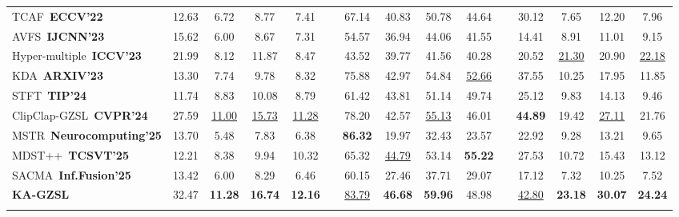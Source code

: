 \documentclass[lettersize,journal]{IEEEtran}
\begin{document}
\begin{table}[!t]
\begin{tabular}{l cccc c cccc c cccc}
    TCAF \cite{5} \,{\scriptsize \textbf{ECCV'22}} & 12.63 & 6.72 & 8.77 & 7.41 & & 67.14 & 40.83 & 50.78 & 44.64 & & 30.12 & 7.65 & 12.20 & 7.96 \\
    AVFS \cite{6} \,{\scriptsize \textbf{IJCNN'23}} & 15.62 & 6.00 & 8.67 & 7.31 & & 54.57 & 36.94 & 44.06 & 41.55 & & 14.41 & 8.91 & 11.01 & 9.15 \\
    Hyper-multiple \cite{7} \,{\scriptsize \textbf{ICCV'23}} & 21.99 & 8.12 & 11.87 & 8.47 & & 43.52 & 39.77 & 41.56 & 40.28 & & 20.52 & \underline{21.30} & 20.90 & \underline{22.18} \\
    KDA \cite{9} \,{\scriptsize \textbf{ARXIV'23}} & 13.30 & 7.74 & 9.78 & 8.32 & & 75.88 & 42.97 & 54.84 & \underline{52.66} & & 37.55 & 10.25 & 17.95 & 11.85 \\
    STFT\cite{43} \,{\scriptsize \textbf{TIP'24}} & 11.74 & 8.83 & 10.08 & 8.79 & & 61.42 & 43.81 & 51.14 & 49.74 & & 25.12 & 9.83 & 14.13 & 9.46 \\
    ClipClap-GZSL \cite{2} \,{\scriptsize \textbf{CVPR'24}} & 27.59 & \underline{11.00} & \underline{15.73} & \underline{11.28} & & 78.20 & 42.57 & \underline{55.13} & 46.01 & & \textbf{44.89} & 19.42 & \underline{27.11} & 21.76 \\
    MSTR \cite{14} \,{\scriptsize \textbf{Neurocomputing'25}} & 13.70 & 5.48 & 7.83 & 6.38 & & \textbf{86.32} & 19.97 & 32.43 & 23.57 & & 22.92 & 9.28 & 13.21 & 9.65 \\
    MDST++ \cite{44} \,{\scriptsize \textbf{TCSVT'25}} & 12.21 & 8.38 & 9.94 & 10.32 & & 65.32 & \underline{44.79} & 53.14 & \textbf{55.22} & & 27.53 & 10.72 & 15.43 & 13.12 \\
    SACMA \cite{45} \,{\scriptsize \textbf{Inf.Fusion'25}} & 13.42 & 6.00 & 8.29 & 6.46 & & 60.15 & 27.46 & 37.71 & 29.07 & & 17.12 & 7.32 & 10.25 & 7.52 \\
    
    \noalign{\global\setlength{\oldaboverulesep}{\aboverulesep}}
    \noalign{\global\setlength{\oldbelowrulesep}{\belowrulesep}}
    \noalign{\global\setlength{\aboverulesep}{0pt}}
    \noalign{\global\setlength{\belowrulesep}{1.5pt}}
    \midrule[1pt]
    \rowcolor{gray!25}
    \textbf{KA-GZSL} & 32.47 & \textbf{11.28} & \textbf{16.74} & \textbf{12.16} & & \underline{83.79} & \textbf{46.68} & \textbf{59.96} & 48.98 & & \underline{42.80} & \textbf{23.18} & \textbf{30.07} & \textbf{24.24}\\
    \bottomrule[2pt]
    \noalign{\global\setlength{\aboverulesep}{\oldaboverulesep}}
    \noalign{\global\setlength{\belowrulesep}{\oldbelowrulesep}}
    
  \end{tabular}
\end{table}
\end{document}
